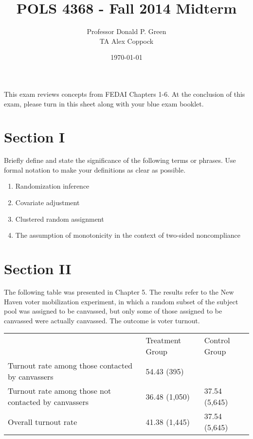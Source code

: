 \documentclass[11pt,notitlepage]{article}		%
\title{POLS 4368 - Fall 2014 Midterm}
\author{Professor Donald P. Green \\
TA Alex Coppock}
\date{\today}
\begin{document}
\maketitle

This exam reviews concepts from FEDAI Chapters 1-6.  At the conclusion of this exam, please turn in this sheet along with your blue exam booklet.
\section{Section I}
Briefly define and state the significance of the following terms or phrases.  Use formal notation to make your definitions as clear as possible.
\begin{enumerate}
\item Randomization inference
\item Covariate adjustment
\item Clustered random assignment
\item The assumption of monotonicity in the context of two-sided noncompliance
\end{enumerate}

\section{Section II}
The following table was presented in Chapter 5. The results refer to the New Haven voter mobilization experiment, in which a random subset of the subject pool was assigned to be canvassed, but only some of those assigned to be canvassed were actually canvassed.  The outcome is voter turnout.


\begin{table}

    \begin{tabular}{lll}
    ~                                                    & Treatment Group & Control Group \\
    Turnout rate among those contacted by canvassers     & 54.43 (395)     & ~             \\
    Turnout rate among those not contacted by canvassers & 36.48 (1,050)   & 37.54 (5,645) \\
    Overall turnout rate                                 & 41.38 (1,445)   & 37.54 (5,645) \\
    \end{tabular}
\end{table}
\end{document}
